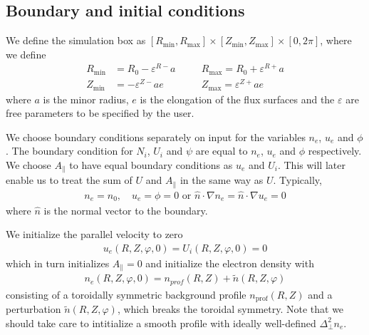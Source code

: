 \subsection{Boundary and initial conditions}
We define the simulation box as
$[ R_{\min}, R_{\max}]\times [Z_{\min}, Z_{\max}] \times [0,2\pi]$,
where we define
\begin{align} \label{eq:box}
    R_{\min}&=R_0-\varepsilon^{R-}a\quad
    &&R_{\max}=R_0+\varepsilon^{R+}a\nonumber\\
    Z_{\min}&=-\varepsilon^{Z-}ae\quad
    &&Z_{\max}=\varepsilon^{Z+}ae
\end{align}
where $a$ is the minor radius, $e$ is the elongation of the flux surfaces and
the $\varepsilon$ are free parameters to be specified by the user.

We choose boundary conditions separately on input for the variables
$n_e$, $u_e$ and $\phi$. The boundary condition for $N_i$, $U_i$ and
$\psi$ are equal to $n_e$, $u_e$ and $\phi$ respectively.
We choose $A_\parallel$ to have equal boundary conditions as $u_e$ and $U_i$.
This will later enable us to treat the sum of $U$ and $A_\parallel$
in the same way as $U$.
Typically,
\begin{align}
n_e = n_0, \quad u_e = \phi = 0
\text{ or } \hat n \cdot \nabla n_e = \hat n \cdot \nabla u_e = 0
\end{align}
where $\hat n$ is the normal vector to the boundary.

We initialize the parallel velocity to zero
\begin{align}
  u_e(R,Z,\varphi,0) = U_i(R,Z,\varphi,0) = 0
  \label{}
\end{align}
which in turn initializes $A_\parallel = 0$
and initialize the electron density with
\begin{align} \label{eq:initial_ne}
    n_e(R,Z,\varphi, 0)= n_{prof}(R,Z) + \tilde n(R,Z,\varphi)
\end{align}
consisting of a toroidally symmetric background profile $n_{\text{prof}}(R,Z)$ and a perturbation
$\tilde n(R,Z,\varphi)$, which breaks the toroidal symmetry.
Note that we should take care to intitialize a smooth profile with ideally well-defined $\Delta^2_\perp n_e$.

